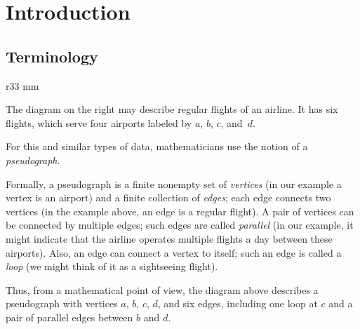 \chapter{Introduction}

\section{Terminology}

\begin{wrapfigure}{r}{33 mm}
\end{wrapfigure}

The diagram on the right may describe regular flights of an airline.
It has six flights,  which serve four airports labeled by $a$, $b$, $c$, and~$d$.

For this and similar types of data, mathematicians use the notion of a \emph{pseudograph}.

Formally, a pseudograph is a finite nonempty set of \emph{vertices}  (in our example a vertex is an airport) 
and a finite collection of \emph{edges}; each edge connects two vertices (in the example above, an edge is a regular flight).
A pair of vertices can be connected by multiple edges;
such edges are called \emph{parallel}
(in our example, it might indicate that the airline operates multiple flights a day between these airports). 
Also, an edge can connect a vertex to itself; such an edge is called a \emph{loop} (we might think of it as a sightseeing flight).

Thus, from a mathematical point of view, the diagram above describes a pseudograph with vertices $a$, $b$, $c$, $d$, and 
six edges, including one loop at $c$ and a pair of parallel edges between $b$ and $d$.

\smallskip

